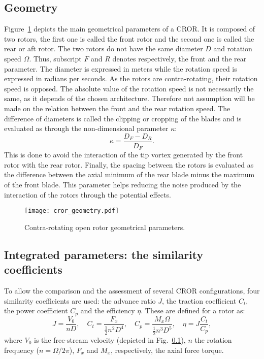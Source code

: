 \subsection{Geometry}
\label{sub:ca_geometry}

Figure~\ref{fig:ca_cror_geometry} depicts the main
geometrical parameters of a CROR.
It is composed of two rotors, the first one is called
the front rotor and the second one is called the rear or aft rotor.
The two rotors do not have the same diameter $D$ and rotation speed
$\Omega$. Thus, subscript $F$ and $R$ denotes respectively,
the front and the rear parameter. The diameter is expressed in meters
while the rotation speed is expressed in radians per seconds.
As the rotors are contra-rotating, their rotation speed is opposed.
The absolute value of the rotation speed is not necessarily the same,
as it depends of the chosen architecture. Therefore not assumption
will be made on the relation between the front and the rear
rotation speed.
The difference of diameters is called the clipping or cropping
of the blades and is evaluated as through the non-dimensional parameter
$\kappa$:
\begin{equation}
    \kappa = \frac{D_F - D_R}{D_F}.
\end{equation}
This is done to avoid the interaction of the tip vortex generated
by the front rotor with the rear rotor.
Finally, the spacing between the rotors
is evaluated as the difference between the axial minimum of the
rear blade minus the maximum of the front blade. This parameter
helps reducing the noise produced by the interaction of
the rotors through the potential effects.
\begin{figure}[htbp]
  \centering
  \texttt{[image: cror\_geometry.pdf]}
  \caption{Contra-rotating open rotor geometrical parameters.}
  \label{fig:ca_cror_geometry}
\end{figure}

\subsection{Integrated parameters: the similarity coefficients}
\label{sub:ca_similarity_coeff}

To allow the comparison and the assessment of several
CROR configurations, four similarity coefficients are used:
the advance ratio $J$, the traction coefficient $C_t$, 
the power coefficient $C_p$ and the efficiency $\eta$.
These are defined for a rotor as:
\begin{equation}
    J = \frac{V_0}{n D}, \quad
    C_t = \frac{F_x}{\frac{1}{2} n ^ 2  D ^ 4}, \quad
    C_p = \frac{M_x \Omega}{\frac{1}{2} n ^ 3 D ^ 5}, \quad
    \eta = J \frac{C_t}{C_p},
\end{equation}
where $V_0$ is the free-stream velocity (depicted in Fig.~\ref{sub:ca_geometry}), 
$n$ the rotation frequency ($n = \Omega / 2 \pi$), 
$F_x$ and $M_x$, respectively, the axial force torque.

